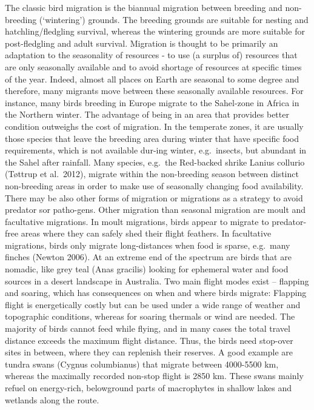 \documentclass[
]{book}
\begin{document}
The classic bird migration is the biannual migration between breeding and non-breeding (`wintering') grounds. The breeding grounds are suitable for nesting and hatchling/fledgling survival, whereas the wintering grounds are more suitable for post-fledgling and adult survival. Migration is thought to be primarily an adaptation to the seasonality of resources - to use (a surplus of) resources that are only seasonally available and to avoid shortage of resources at specific times of the year.
Indeed, almost all places on Earth are seasonal to some degree and therefore, many migrants move between these seasonally available resources. For instance, many birds breeding in Europe migrate to the Sahel-zone in Africa in the Northern winter. The advantage of being in an area that provides better condition outweighs the cost of migration. In the temperate zones, it are usually those species that leave the breeding area during winter that have specific food requirements, which is not available dur-ing winter, e.g.~insects, but abundant in the Sahel after rainfall. Many species, e.g.~the Red-backed shrike Lanius collurio (Tøttrup et al.~2012), migrate within the non-breeding season between distinct non-breeding areas in order to make use of seasonally changing food availability.\\
There may be also other forms of migration or migrations as a strategy to avoid predator sor patho-gens.
Other migration than seasonal migration are moult and facultative migrations. In moult migrations, birds appear to migrate to predator-free areas where they can safely shed their flight feathers. In facultative migrations, birds only migrate long-distances when food is sparse, e.g.~many finches (Newton 2006). At an extreme end of the spectrum are birds that are nomadic, like grey teal (Anas gracilis) looking for ephemeral water and food sources in a desert landscape in Australia.
Two main flight modes exist -- flapping and soaring, which has consequences on when and where birds migrate: Flapping flight is energetically costly but can be used under a wide range of weather and topographic conditions, whereas for soaring thermals or wind are needed.
The majority of birds cannot feed while flying, and in many cases the total travel distance exceeds the maximum flight distance. Thus, the birds need stop-over sites in between, where they can replenish their reserves. A good example are tundra swans (Cygnus columbianus) that migrate between 4000-5500 km, whereas the maximally recorded non-stop flight is 2850 km. These swans mainly refuel on energy-rich, belowground parts of macrophytes in shallow lakes and wetlands along the route.
\end{document}
